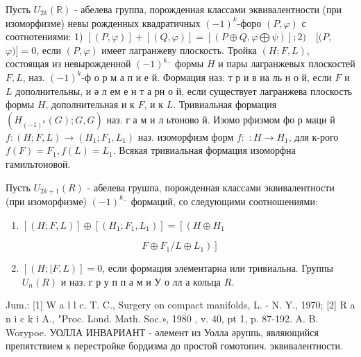 \documentclass[10pt]{article}
\begin{document}
Пусть $U_{2 k}(\mathbb{R})$ - абелева группа, порожденная классами эквивалентности (при изоморфизме) невы рожденных квадратичных $(-1)^{k}$-форо $(P, \varphi)$ с соотнотениями: 1) $[(P, \varphi)]+[(Q, \varphi)]=[(P \oplus Q, \varphi \bigoplus \psi)] ; 2) \quad[(P$, $\varphi)]=0$, если $(P, \varphi)$ имеет лагранжеву плоскость. Тройка $(H ; F, L)$, состоящая из невырожденной $(-1)^{k_{-}}$ формы $H$ и пары лагранжевых плоскостей $F, L$, наз. $(-1)^{k}$-ф о р м а п и е й. Формация наз. т р и в иа ль н о й, если $F$ и $L$ дополнительны, и ә л ем е н т а рн о й, если существует лагранжева плоскость формы $H$, дополнительная и к $F$, и к $L$. Тривиальная формация $\left(H_{(-1)^{k}}(G) ; G, G\right)$ наз. г а м и л ьтоново й. Изомо рфизмом фо р маци й $f:(H ; F, L) \rightarrow\left(H_{1} ; F_{1}, L_{1}\right)$ наз. изоморфизм форм $f:$ $: H \rightarrow H_{1}$, для к-рого $f(F)=F_{1}, f(L)=L_{1}$. Всякая тривиальная формация изоморфна гамильтоновой.



Пусть $U_{2 k+1}(R)$ - абелева грушпа, порожденная классами эквивалентности (при изоморфизме) $(-1)^{k_{-}}$ формаций, со следующими соотношениями:



\begin{enumerate}

  \item $[(H ; F, L)] \oplus\left[\left(H_{1} ; F_{1}, L_{1}\right)\right]=\left[\left(H \oplus H_{1}\right.\right.$

\end{enumerate}



\[

\left.\left.F \oplus F_{1} / L \oplus L_{1}\right)\right]

\]



\begin{enumerate}

  \setcounter{enumi}{1}

  \item $[(H ; \mid F, L)]=0$, если формация элементарна или тривиальна. Группы $U_{n}(R)$ и наз. г р у п п а м и У о лл а кольца $R$.

\end{enumerate}



Jum.: [1] W a l l c. T. C., Surgery on compact manifolds, L. - N. Y., 1970; [2] R a n i c k i A., "Proc. Lond. Math. Soc.», 1980 , v. 40, pt 1, p. 87-192. A. B. Worypoe. УОЛЛА ИНВАРИАНТ - әлемент из Уолла әруппь, являющийся препятствием к перестройке бордизма до простой гомотопич. эквивалентности.
\end{document}

